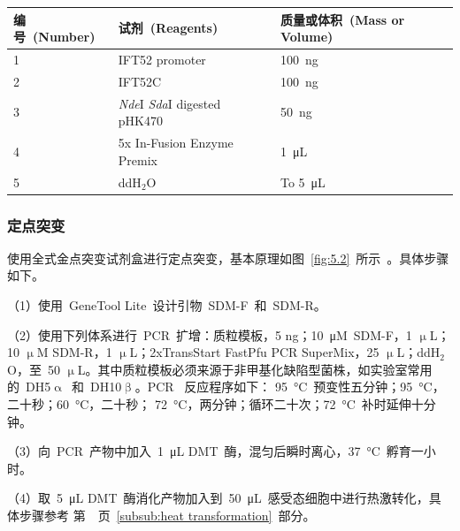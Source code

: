 \begin{table}[!ht]
\centering
{
\par}
\small
\begin{tabular*}{\textwidth}[c]{@{\extracolsep{\fill}}lll}
\toprule
编号\ (Number) & 试剂\ (Reagents)       & 质量或体积\ (Mass or Volume)\\
\midrule
1 & IFT52 promoter                              & \SI{100}{\ng}\\
2 & IFT52C                                      & \SI{100}{\ng}\\
3 & \textit{Nde}I \textit{Sda}I digested pHK470 & \SI{50}{\ng}\\
4 & 5x In-Fusion Enzyme Premix                  & \SI{1}{\uL}\\
5 & ddH$_2$O                                    & To \SI{5}{\uL}\\
\bottomrule
\end{tabular*}
\end{table}

\subsubsection{定点突变}\label{subsubsec:SDM}
使用全式金点突变试剂盒进行定点突变，基本原理如图\
\ref{fig:5.2}\ 所示\
\citep{Higuchi1988,Zheng2004,Ko2005}。具体步骤如下。

（1）使用\ GeneTool Lite\ 设计引物\ SDM-F\ 和\ SDM-R。

（2）使用下列体系进行\ PCR\ 扩增：质粒模板，5 ng；\SI{10}{\micro\nauticalmile}\ SDM-F，1 $\upmu$L；10 $\upmu$M SDM-R，1 $\upmu$L；2xTransStart FastPfu PCR SuperMix，25 $\upmu$L；ddH$_2$O，至\ 50 $\upmu$L。其中质粒模板必须来源于非甲基化缺陷型菌株，如实验室常用的\ DH5$\upalpha$\ 和\ DH10$\upbeta$。PCR \ 反应程序如下：
\SI{95}{\degreeCelsius}\ 预变性五分钟；\SI{95}{\degreeCelsius}，二十秒；\SI{60}{\degreeCelsius}，二十秒；
\SI{72}{\degreeCelsius}，两分钟；循环二十次；\SI{72}{\degreeCelsius}\ 补时延伸十分钟。

（3）向\ PCR\ 产物中加入\ \SI{1}{\uL} DMT\ 酶，混匀后瞬时离心，\SI{37}{\degreeCelsius}\ 孵育一小时。

（4）取\ \SI{5}{\uL} DMT\ 酶消化产物加入到\ \SI{50}{\uL}\ 感受态细胞中进行热激转化，具体步骤参考
第\ \pageref{subsub:heat transformation}\ 页\ \ref{subsub:heat transformation}\ 部分。

